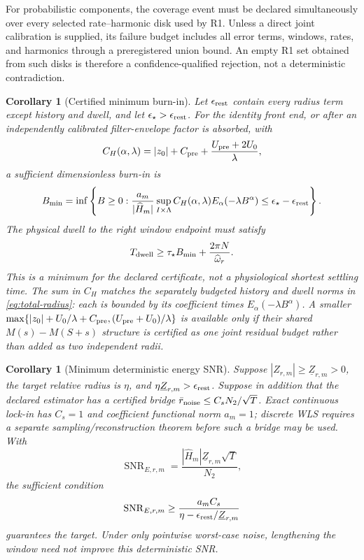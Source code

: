 \documentclass[11pt]{article}
\newtheorem{corollary}[theorem]{Corollary}
\theoremstyle{definition}
\theoremstyle{remark}
\begin{document}
For probabilistic components, the coverage event must be declared
simultaneously over every selected rate--harmonic disk used by R1.  Unless a
direct joint calibration is supplied, its failure budget includes all error
terms, windows, rates, and harmonics through a preregistered union bound.  An
empty R1 set obtained from such disks is therefore a confidence-qualified
rejection, not a deterministic contradiction.

\begin{corollary}[Certified minimum burn-in]
Let \(\epsilon_{\rm rest}\) contain every radius term except history and
dwell, and let \(\epsilon_\star>\epsilon_{\rm rest}\).  For the identity front
end, or after an independently calibrated filter-envelope factor is absorbed,
with
\[
 C_H(\alpha,\lambda)=|z_0|+C_{\rm pre}
 +\frac{U_{\rm pre}+2U_0}{\lambda},
\]
a sufficient dimensionless burn-in is
\[
 B_{\min}=\inf\left\{B\ge0:
 \frac{a_m}{|\widehat H_m|}
 \sup_{I\times\Lambda}C_H(\alpha,\lambda)
 E_\alpha(-\lambda B^\alpha)
 \le\epsilon_\star-\epsilon_{\rm rest}\right\}.
\]
The physical dwell to the right window endpoint must satisfy
\[
 T_{\rm dwell}\ge\tau_\star B_{\min}
 +\frac{2\pi N}{\widehat\omega_r}.
\]
This is a minimum for the declared certificate, not a physiological shortest
settling time.
The sum in \(C_H\) matches the separately budgeted history and dwell norms in
\eqref{eq:total-radius}: each is bounded by its coefficient times
\(E_\alpha(-\lambda B^\alpha)\).  A smaller
\(\max\{|z_0|+U_0/\lambda+C_{\rm pre},
(U_{\rm pre}+U_0)/\lambda\}\) is available only if their shared
\(M(s)-M(S+s)\) structure is certified as one joint residual budget rather
than added as two independent radii.
\end{corollary}

\begin{corollary}[Minimum deterministic energy SNR]
Suppose \(|Z_{r,m}|\ge\underline Z_{r,m}>0\), the target relative radius is
\(\eta\), and \(\eta\underline Z_{r,m}>\epsilon_{\rm rest}\).  Suppose in
addition that the declared estimator has a certified bridge
\(\bar r_{\rm noise}\le C_sN_2/\sqrt T\).  Exact continuous lock-in has
\(C_s=1\) and coefficient functional norm \(a_m=1\); discrete WLS requires a
separate sampling/reconstruction theorem before such a bridge may be used.
With
\[
 \operatorname{SNR}_{E,r,m}=
 \frac{|\widehat H_m|\underline Z_{r,m}\sqrt T}{N_2},
\]
the sufficient condition
\[
 \operatorname{SNR}_{E,r,m}\ge
 \frac{a_mC_s}{\eta-\epsilon_{\rm rest}/\underline Z_{r,m}}
\]
guarantees the target.  Under only pointwise worst-case noise, lengthening the
window need not improve this deterministic SNR.
\end{corollary}
\end{document}
